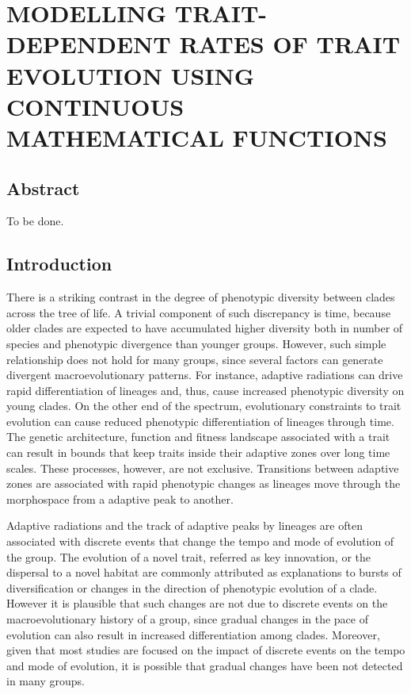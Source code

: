 
\chapter{MODELLING TRAIT-DEPENDENT RATES OF TRAIT EVOLUTION USING CONTINUOUS MATHEMATICAL FUNCTIONS}

\section{Abstract}

To be done.

\section{Introduction}

There is a striking contrast in the degree of phenotypic diversity between clades across the tree of life. A trivial component of such discrepancy is time, because older clades are expected to have accumulated higher diversity both in number of species and phenotypic divergence than younger groups. However, such simple relationship does not hold for many groups, since several factors can generate divergent macroevolutionary patterns. For instance, adaptive radiations can drive rapid differentiation of lineages and, thus, cause increased phenotypic diversity on young clades. On the other end of the spectrum, evolutionary constraints to trait evolution can cause reduced phenotypic differentiation of lineages through time. The genetic architecture, function and fitness landscape associated with a trait can result in bounds that keep traits inside their adaptive zones over long time scales. These processes, however, are not exclusive. Transitions between adaptive zones are associated with rapid phenotypic changes as lineages move through the morphospace from a adaptive peak to another.

Adaptive radiations and the track of adaptive peaks by lineages are often associated with discrete events that change the tempo and mode of evolution of the group. The evolution of a novel trait, referred as key innovation, or the dispersal to a novel habitat are commonly attributed as explanations to bursts of diversification or changes in the direction of phenotypic evolution of a clade. However it is plausible that such changes are not due to discrete events on the macroevolutionary history of a group, since gradual changes in the pace of evolution can also result in increased differentiation among clades. Moreover, given that most studies are focused on the impact of discrete events on the tempo and mode of evolution, it is possible that gradual changes have been not detected in many groups.

